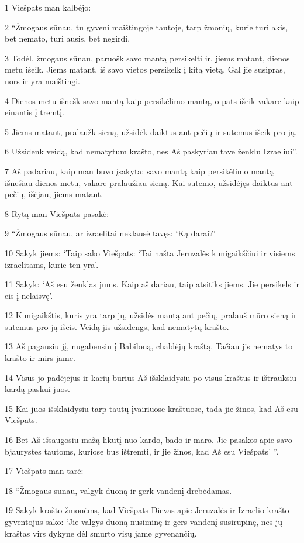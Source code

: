\par 1 Viešpats man kalbėjo: 
\par 2 “Žmogaus sūnau, tu gyveni maištingoje tautoje, tarp žmonių, kurie turi akis, bet nemato, turi ausis, bet negirdi. 
\par 3 Todėl, žmogaus sūnau, paruošk savo mantą persikelti ir, jiems matant, dienos metu išeik. Jiems matant, iš savo vietos persikelk į kitą vietą. Gal jie susipras, nors ir yra maištingi. 
\par 4 Dienos metu išnešk savo mantą kaip persikėlimo mantą, o pats išeik vakare kaip einantis į tremtį. 
\par 5 Jiems matant, pralaužk sieną, užsidėk daiktus ant pečių ir sutemus išeik pro ją. 
\par 6 Užsidenk veidą, kad nematytum krašto, nes Aš paskyriau tave ženklu Izraeliui”. 
\par 7 Aš padariau, kaip man buvo įsakyta: savo mantą kaip persikėlimo mantą išnešiau dienos metu, vakare pralaužiau sieną. Kai sutemo, užsidėjęs daiktus ant pečių, išėjau, jiems matant. 
\par 8 Rytą man Viešpats pasakė: 
\par 9 “Žmogaus sūnau, ar izraelitai neklausė tavęs: ‘Ką darai?’ 
\par 10 Sakyk jiems: ‘Taip sako Viešpats: ‘Tai našta Jeruzalės kunigaikščiui ir visiems izraelitams, kurie ten yra’. 
\par 11 Sakyk: ‘Aš esu ženklas jums. Kaip aš dariau, taip atsitiks jiems. Jie persikels ir eis į nelaisvę’. 
\par 12 Kunigaikštis, kuris yra tarp jų, užsidės mantą ant pečių, pralauš mūro sieną ir sutemus pro ją išeis. Veidą jis užsidengs, kad nematytų krašto. 
\par 13 Aš pagausiu jį, nugabensiu į Babiloną, chaldėjų kraštą. Tačiau jis nematys to krašto ir mirs jame. 
\par 14 Visus jo padėjėjus ir karių būrius Aš išsklaidysiu po visus kraštus ir ištrauksiu kardą paskui juos. 
\par 15 Kai juos išsklaidysiu tarp tautų įvairiuose kraštuose, tada jie žinos, kad Aš esu Viešpats. 
\par 16 Bet Aš išsaugosiu mažą likutį nuo kardo, bado ir maro. Jie pasakos apie savo bjaurystes tautoms, kuriose bus ištremti, ir jie žinos, kad Aš esu Viešpats’ ”. 
\par 17 Viešpats man tarė: 
\par 18 “Žmogaus sūnau, valgyk duoną ir gerk vandenį drebėdamas. 
\par 19 Sakyk krašto žmonėms, kad Viešpats Dievas apie Jeruzalės ir Izraelio krašto gyventojus sako: ‘Jie valgys duoną nusiminę ir gers vandenį susirūpinę, nes jų kraštas virs dykyne dėl smurto visų jame gyvenančių. 
